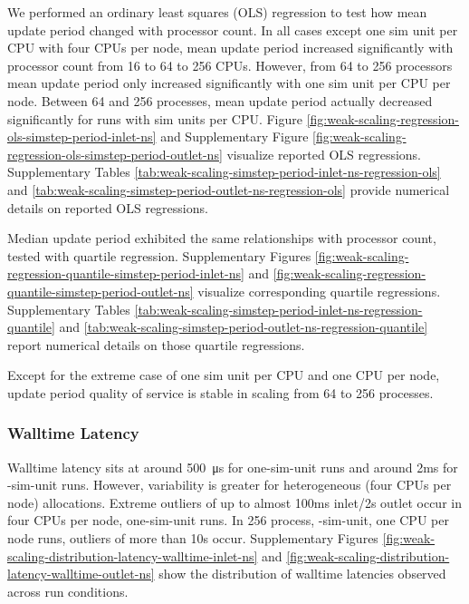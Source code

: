 

We performed an ordinary least squares (OLS) regression to test how mean update period changed with processor count.
In all cases except one sim unit per CPU with four CPUs per node, mean update period increased significantly with processor count from 16 to 64 to 256 CPUs.
However, from 64 to 256 processors mean update period only increased significantly with one sim unit per CPU per node.
Between 64 and 256 processes, mean update period actually decreased significantly for runs with  sim units per CPU.
Figure \ref{fig:weak-scaling-regression-ols-simstep-period-inlet-ns} and Supplementary Figure \ref{fig:weak-scaling-regression-ols-simstep-period-outlet-ns} visualize reported OLS regressions.
Supplementary Tables \ref{tab:weak-scaling-simstep-period-inlet-ns-regression-ols} and \ref{tab:weak-scaling-simstep-period-outlet-ns-regression-ols} provide numerical details on reported OLS regressions.

Median update period exhibited the same relationships with processor count, tested with quartile regression.
Supplementary Figures \ref{fig:weak-scaling-regression-quantile-simstep-period-inlet-ns} and \ref{fig:weak-scaling-regression-quantile-simstep-period-outlet-ns} visualize corresponding quartile regressions.
Supplementary Tables \ref{tab:weak-scaling-simstep-period-inlet-ns-regression-quantile} and \ref{tab:weak-scaling-simstep-period-outlet-ns-regression-quantile} report numerical details on those quartile regressions.

Except for the extreme case of one sim unit per CPU and one CPU per node, update period quality of service is stable in scaling from 64 to 256 processes.

\subsubsection{Walltime Latency}

Walltime latency sits at around \SI{500}{\micro\second} for one-sim-unit runs and around 2ms for -sim-unit runs.
However, variability is greater for heterogeneous (four CPUs per node) allocations.
Extreme outliers of up to almost 100ms inlet/2s outlet occur in four CPUs per node, one-sim-unit runs.
In 256 process, -sim-unit, one CPU per node runs, outliers of more than 10s occur.
Supplementary Figures \ref{fig:weak-scaling-distribution-latency-walltime-inlet-ns} and \ref{fig:weak-scaling-distribution-latency-walltime-outlet-ns} show the distribution of walltime latencies observed across run conditions.

